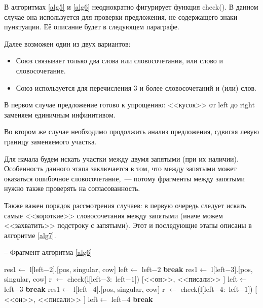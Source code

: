\documentclass[main]{subfiles}
\begin{document}
В алгоритмах \ref{alg5} и \ref{alg6} неоднократно фигурирует функция check(). В данном случае она используется для проверки предложения, не содержащего знаки пунктуации. Её описание будет в следующем параграфе.

Далее возможен один из двух вариантов:
\begin{itemize}
	\item Союз связывает только два слова или словосочетания, или слово и словосочетание.
	\item Союз используется для перечисления $3$ и более словосочетаний и (или) слов.
\end{itemize}

В первом случае предложение готово к упрощению: <<кусок>> от left до right заменяем единичным инфинитивом.

Во втором же случае необходимо продолжить анализ предложения, сдвигая левую границу заменяемого участка.

Для начала будем искать участки между двумя запятыми (при их наличии). Особенность данного этапа заключается в том, что между запятыми может оказаться ошибочное словосочетание,~--- потому фрагменты между запятыми нужно также проверять на согласованность.

Также важен порядок рассмотрения случаев: в первую очередь следует искать самые <<короткие>> словосочетания между запятыми (иначе можем <<захватить>> подстроку с запятыми). Этот и последующие этапы описаны в алгоритме \ref{alg7}.

\begin{algorithm}
	\caption{-- Фрагмент алгоритма \ref{alg6}}\label{alg7}
	\begin{algorithmic}[1]
	 
	\State res1$\gets$ l$[$left$-2]$.[pos, singular, cow]
	\State left$\gets$ left$-2$
	\State \textbf{break}
	\EndIf
	\EndFor
	 
	\State  res1$\gets$ l$[$left$-3]$.[pos, singular, cow]
	\State r $\gets$ check(l$[$left$-3:$ left$-1 ]$)
	\State \Return $[$<<он>>, <<писали>> $]$
	\State left$\gets$ left$-3$
	\State \textbf{break}
	\EndIf
	\EndIf
	\EndFor
	\State  res1$\gets$ l$[$left$-4]$.[pos, singular, cow]
	\State r $\gets$ check(l$[$left$-4:$ left$-1 ]$)
	\State \Return $[$<<он>>, <<писали>> $]$
	\State left$\gets$ left$-4$
	\State \textbf{break}
	\EndIf
	\EndIf
	\end{algorithmic}
	\end{algorithm}
\end{document}
